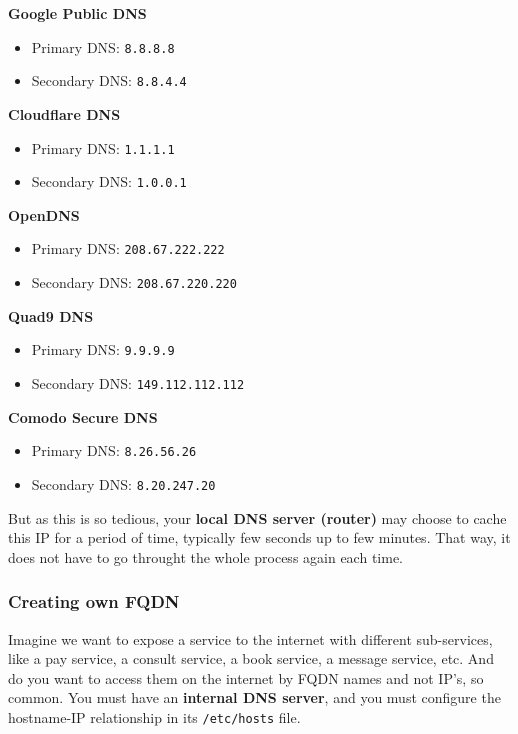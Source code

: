 \documentclass{article}
\begin{document}
\textbf{Google Public DNS}
\begin{itemize}
    \item Primary DNS: \texttt{8.8.8.8}
    \item Secondary DNS: \texttt{8.8.4.4}
\end{itemize}
    
\textbf{Cloudflare DNS}
\begin{itemize}
    \item Primary DNS: \texttt{1.1.1.1}
    \item Secondary DNS: \texttt{1.0.0.1}
\end{itemize}
    
\textbf{OpenDNS}
\begin{itemize}
    \item Primary DNS: \texttt{208.67.222.222}
    \item Secondary DNS: \texttt{208.67.220.220}
\end{itemize}
    
\textbf{Quad9 DNS}
\begin{itemize}
    \item Primary DNS: \texttt{9.9.9.9}
    \item Secondary DNS: \texttt{149.112.112.112}
\end{itemize}
    
\textbf{Comodo Secure DNS}
\begin{itemize}
    \item Primary DNS: \texttt{8.26.56.26}
    \item Secondary DNS: \texttt{8.20.247.20}
\end{itemize}

But as this is so tedious, your \textbf{local DNS server (router)} may choose to cache this IP for a period of time, typically few seconds up to few minutes. That way, it does not have to go throught the whole process again each time.

\subsubsection{Creating own FQDN}

Imagine we want to expose a service to the internet with different sub-services, like a pay service, a consult service, a book service, a message service, etc. And do you want to access them on the internet by FQDN names and not IP's, so common. You must have an \textbf{internal DNS server}, and you must configure the hostname-IP relationship in its \verb|/etc/hosts| file.
\end{document}
